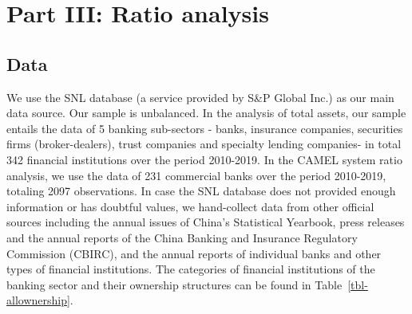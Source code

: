 \documentclass[
  letterpaper,
  DIV=11,
  numbers=noendperiod]{scrreprt}
\begin{document}
\section{Part III: Ratio analysis}\label{part-iii-ratio-analysis}

\subsection{Data}\label{data}

We use the SNL database (a service provided by S\&P Global Inc.) as our
main data source. Our sample is unbalanced. In the analysis of total
assets, our sample entails the data of 5 banking sub-sectors - banks,
insurance companies, securities firms (broker-dealers), trust companies
and specialty lending companies- in total 342 financial institutions
over the period 2010-2019. In the CAMEL system ratio analysis, we use
the data of 231 commercial banks over the period 2010-2019, totaling
2097 observations. In case the SNL database does not provided enough
information or has doubtful values, we hand-collect data from other
official sources including the annual issues of China's Statistical
Yearbook, press releases and the annual reports of the China Banking and
Insurance Regulatory Commission (CBIRC), and the annual reports of
individual banks and other types of financial institutions. The
categories of financial institutions of the banking sector and their
ownership structures can be found in Table~\ref{tbl-allownership}.

\begingroup\fontsize{8}{10}\selectfont
\end{document}
